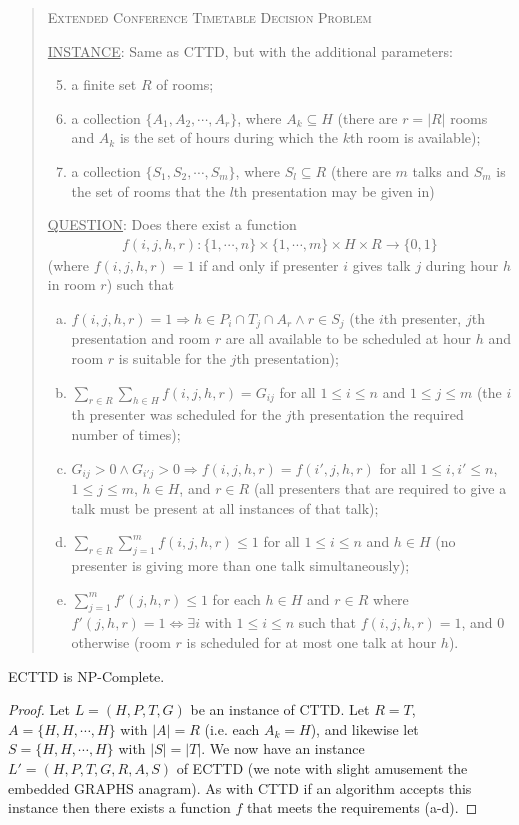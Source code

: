 \documentclass{svjour3}                     %
\begin{document}
\begin{quote}
	\textsc{Extended Conference Timetable Decision Problem}
	
	\underline{INSTANCE}: Same as CTTD, but with the additional parameters:
	\begin{enumerate}[1.]
		\setcounter{enumi}{4}
		\item a finite set $R$ of rooms;
		\item a collection $\{A_1,A_2,\cdots,A_r\}$, where $A_k \subseteq H$ (there are $r=|R|$ rooms and $A_k$ is the set of hours during which the $k$th room is available);
		\item a collection $\{S_1,S_2,\cdots,S_m\}$, where $S_l \subseteq R$ (there are $m$ talks and $S_m$ is the set of rooms that the $l$th presentation may be given in)
	\end{enumerate}
	\underline{QUESTION}: Does there exist a function 
	\begin{gather*}
		f(i,j,h,r) : \{1,\cdots,n\} \times \{1,\cdots,m\} \times H \times R \rightarrow \{0,1\}
	\end{gather*}
	(where $f(i,j,h,r)=1$ if and only if presenter $i$ gives talk $j$ during hour $h$ in room $r$) such that
	\begin{enumerate}[(a)]
		\item $f(i,j,h,r) = 1 \Rightarrow h \in P_i \cap T_j \cap A_r \land r \in S_j$ (the $i$th presenter, $j$th presentation and room $r$ are all available to be scheduled at hour $h$ and room $r$ is suitable for the $j$th presentation);
		\item $\sum\limits_{r \in R}\sum\limits_{h \in H} f(i,j,h,r) = G_{ij}$ for all $1 \le i \le n$ and $1 \le j \le m$ (the $i$th presenter was scheduled for the $j$th presentation the required number of times);
		\item $G_{ij} > 0 \land G_{i'j} > 0 \Rightarrow f(i,j,h,r)=f(i',j,h,r)$ for all $1 \le i,i' \le n$, $1 \le j \le m$, $h \in H$, and $r \in R$ (all presenters that are required to give a talk must be present at all instances of that talk);
		\item $\sum\limits_{r \in R}\sum\limits_{j=1}^m f(i,j,h,r) \le 1$ for all $1 \le i \le n$ and $h \in H$ (no presenter is giving more than one talk simultaneously);
		\item $\sum\limits_{j=1}^m f'(j,h,r) \le 1$ for each $h \in H$ and $r \in R$ where $f'(j,h,r) = 1 \iff \exists i \text{ with } 1 \le i \le n$ such that $f(i,j,h,r)=1$, and 0 otherwise (room $r$ is scheduled for at most one talk at hour $h$).
	\end{enumerate}
\end{quote}
\begin{corollary}
	ECTTD is NP-Complete.
\end{corollary}
\begin{proof}
	Let $L=(H,P,T,G)$ be an instance of CTTD. Let $R=T$, $A=\{H,H,\cdots,H\}$ with $|A|=R$ (i.e. each $A_k=H$), and  likewise let $S=\{H,H,\cdots,H\}$ with $|S|=|T|$. We now have an instance $L'=(H,P,T,G,R,A,S)$ of ECTTD (we note with slight amusement the embedded GRAPHS anagram). As with CTTD if an algorithm accepts this instance then there exists a function $f$ that meets the requirements (a-d).
\end{proof}
\end{document}
